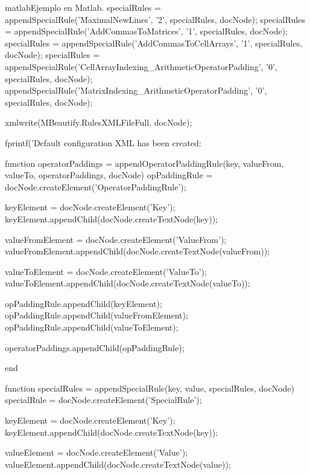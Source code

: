 \begin{sourcecode}{matlab}{Ejemplo en Matlab.}
            specialRules = appendSpecialRule('MaximalNewLines', '2', specialRules, docNode);
            specialRules = appendSpecialRule('AddCommasToMatrices', '1', specialRules, docNode);
            specialRules = appendSpecialRule('AddCommasToCellArrays', '1', specialRules, docNode);
            specialRules = appendSpecialRule('CellArrayIndexing_ArithmeticOperatorPadding', '0', specialRules, docNode);
            appendSpecialRule('MatrixIndexing_ArithmeticOperatorPadding', '0', specialRules, docNode);
            
            xmlwrite(MBeautify.RulesXMLFileFull, docNode);
            
            fprintf('Default configuration XML has been created:\n%
            
            
            function operatorPaddings = appendOperatorPaddingRule(key, valueFrom, valueTo, operatorPaddings, docNode)
                opPaddingRule = docNode.createElement('OperatorPaddingRule');
                
                keyElement = docNode.createElement('Key');
                keyElement.appendChild(docNode.createTextNode(key));
                
                valueFromElement = docNode.createElement('ValueFrom');
                valueFromElement.appendChild(docNode.createTextNode(valueFrom));
                
                valueToElement = docNode.createElement('ValueTo');
                valueToElement.appendChild(docNode.createTextNode(valueTo));
                
                opPaddingRule.appendChild(keyElement);
                opPaddingRule.appendChild(valueFromElement);
                opPaddingRule.appendChild(valueToElement);
                
                operatorPaddings.appendChild(opPaddingRule);
                
            end
            
            function specialRules = appendSpecialRule(key, value, specialRules, docNode)
                specialRule = docNode.createElement('SpecialRule');
                
                keyElement = docNode.createElement('Key');
                keyElement.appendChild(docNode.createTextNode(key));
                
                valueElement = docNode.createElement('Value');
                valueElement.appendChild(docNode.createTextNode(value));
                

\end{sourcecode}
